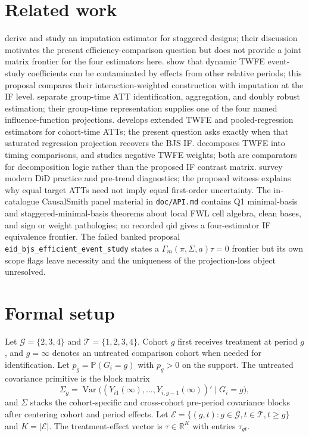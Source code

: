 \documentclass[11pt]{article}
\renewcommand{\Pr}{\mathbb{P}}
\newcommand{\R}{\mathbb{R}}
\theoremstyle{definition}
\theoremstyle{plain}
\theoremstyle{remark}
\begin{document}
\section{Related work}
\citet{borusyak_jaravel_spiess_2024_restud} derive and study an imputation estimator for staggered designs; their discussion motivates the present efficiency-comparison question but does not provide a joint matrix frontier for the four estimators here. \citet{sun_abraham_2021_joe} show that dynamic TWFE event-study coefficients can be contaminated by effects from other relative periods; this proposal compares their interaction-weighted construction with imputation at the IF level. \citet{callaway_santanna_2021_joe} separate group-time ATT identification, aggregation, and doubly robust estimation; their group-time representation supplies one of the four named influence-function projections. \citet{wooldridge_2023_ectj} develops extended TWFE and pooled-regression estimators for cohort-time ATTs; the present question asks exactly when that saturated regression projection recovers the BJS IF. \citet{goodman_bacon_2021_joe} decomposes TWFE into timing comparisons, and \citet{dechaisemartin_dhaultfoeuille_2020_aer} studies negative TWFE weights; both are comparators for decomposition logic rather than the proposed IF contrast matrix. \citet{roth_santanna_bilinski_poe_2023_joe} survey modern DiD practice and pre-trend diagnostics; the proposed witness explains why equal target ATTs need not imply equal first-order uncertainty. The in-catalogue CausalSmith panel material in \texttt{doc/API.md} contains Q1 minimal-basis and staggered-minimal-basis theorems about local FWL cell algebra, clean bases, and sign or weight pathologies; no recorded qid gives a four-estimator IF equivalence frontier. The failed banked proposal \texttt{eid\_bjs\_efficient\_event\_study} states a $\Gamma_m(\pi,\Sigma,a)\tau=0$ frontier but its own scope flags leave necessity and the uniqueness of the projection-loss object unresolved.

\section{Formal setup}
Let $\mathcal{G}=\{2,3,4\}$ and $\mathcal{T}=\{1,2,3,4\}$. Cohort $g$ first receives treatment at period $g$, and $g=\infty$ denotes an untreated comparison cohort when needed for identification. Let $p_g=\Pr(G_i=g)$ with $p_g>0$ on the support. The untreated covariance primitive is the block matrix
\[
\Sigma_g = \operatorname{Var}\bigl((Y_{i1}(\infty),\ldots,Y_{i,g-1}(\infty))'\mid G_i=g\bigr),
\]
and $\Sigma$ stacks the cohort-specific and cross-cohort pre-period covariance blocks after centering cohort and period effects. Let $\mathcal{E}=\{(g,t):g\in\mathcal{G},t\in\mathcal{T},t\geq g\}$ and $K=|\mathcal{E}|$. The treatment-effect vector is $\tau\in\R^K$ with entries $\tau_{gt}$.
\end{document}
